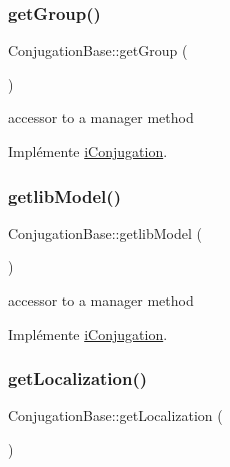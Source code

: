 \hypertarget{class_conjugation_base_aa88c93007f333b916a6a51819e50e8ae}{}\label{class_conjugation_base_aa88c93007f333b916a6a51819e50e8ae} 
\subsubsection{\texorpdfstring{get\+Group()}{getGroup()}}
{\footnotesize\ttfamily Conjugation\+Base\+::get\+Group (\begin{DoxyParamCaption}{ }\end{DoxyParamCaption})}

accessor to a manager method 

Implémente \hyperlink{interfacei_conjugation_a21390064de33a77b99b26ec5a2e55351}{i\+Conjugation}.

\hypertarget{class_conjugation_base_a52db22137154c2fd7a8487406b959652}{}\label{class_conjugation_base_a52db22137154c2fd7a8487406b959652} 
\subsubsection{\texorpdfstring{getlib\+Model()}{getlibModel()}}
{\footnotesize\ttfamily Conjugation\+Base\+::getlib\+Model (\begin{DoxyParamCaption}{ }\end{DoxyParamCaption})}

accessor to a manager method 

Implémente \hyperlink{interfacei_conjugation_a2b6dd0a979a98bc50f6f9f7ec9b69e63}{i\+Conjugation}.

\hypertarget{class_conjugation_base_a27cc8f5f2a3b502e48c22a5b547181ac}{}\label{class_conjugation_base_a27cc8f5f2a3b502e48c22a5b547181ac} 
\subsubsection{\texorpdfstring{get\+Localization()}{getLocalization()}}
{\footnotesize\ttfamily Conjugation\+Base\+::get\+Localization (\begin{DoxyParamCaption}{ }\end{DoxyParamCaption})}

